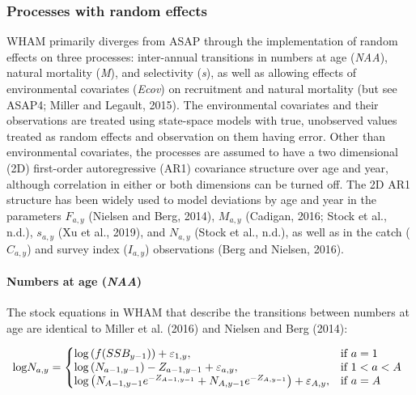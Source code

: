 \documentclass[]{article}
\let\oldparagraph\paragraph
\renewcommand{\paragraph}[1]{\oldparagraph{#1}\mbox{}}
\begin{document}
\hypertarget{processes-with-random-effects}{%
\subsubsection{Processes with random
effects}\label{processes-with-random-effects}}

WHAM primarily diverges from ASAP through the implementation of random
effects on three processes: inter-annual transitions in numbers at age
(\emph{NAA}), natural mortality (\emph{M}), and selectivity (\emph{s}),
as well as allowing effects of environmental covariates (\emph{Ecov}) on
recruitment and natural mortality (but see ASAP4; Miller and Legault,
2015). The environmental covariates and their observations are treated
using state-space models with true, unobserved values treated as random
effects and observation on them having error. Other than environmental
covariates, the processes are assumed to have a two dimensional (2D)
first-order autoregressive (AR1) covariance structure over age and year,
although correlation in either or both dimensions can be turned off. The
2D AR1 structure has been widely used to model deviations by age and
year in the parameters \(F_{a,y}\) (Nielsen and Berg, 2014), \(M_{a,y}\)
(Cadigan, 2016; Stock et al., n.d.), \(s_{a,y}\) (Xu et al., 2019), and
\(N_{a,y}\) (Stock et al., n.d.), as well as in the catch (\(C_{a,y}\))
and survey index (\(I_{a,y}\)) observations (Berg and Nielsen, 2016).

\hypertarget{numbers-at-age-naa}{%
\paragraph{\texorpdfstring{Numbers at age
(\emph{NAA})}{Numbers at age (NAA)}}\label{numbers-at-age-naa}}

The stock equations in WHAM that describe the transitions between
numbers at age are identical to Miller et al. (2016) and Nielsen and
Berg (2014):

\begin{equation}
\label{eq:NAA}
  \text{log}N_{a,y}=\left\{
    \begin{array}{@{}lll@{}}
      \text{log} \left( f(SSB_{y-1}) \right) + \varepsilon_{1,y}, & \text{if}\ a = 1 \\
      \text{log} \left( N_{a-1,y-1} \right) - Z_{a-1,y-1} + \varepsilon_{a,y}, & \text{if}\ 1 < a < A \\
      \text{log} \left( N_{A-1,y-1} e^{-Z_{A-1,y-1}} + N_{A,y-1} e^{-Z_{A,y-1}} \right) + \varepsilon_{A,y}, & \text{if}\ a = A
    \end{array}\right.
\end{equation}
\end{document}
